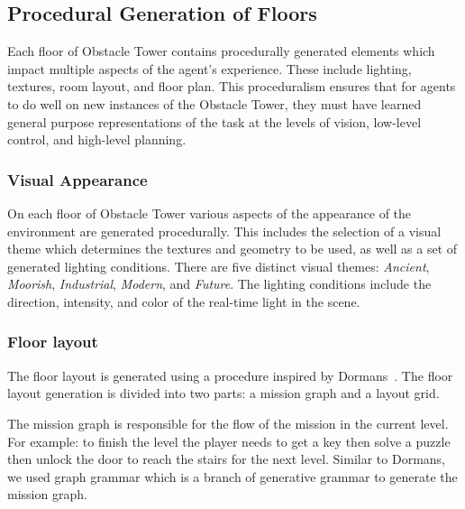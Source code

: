 \documentclass{article}
\begin{document}
\subsection{Procedural Generation of Floors}
Each floor of Obstacle Tower contains procedurally generated elements which impact multiple aspects of the agent's experience. These include lighting, textures, room layout, and floor plan. This proceduralism  ensures that for agents to do well on new instances of the Obstacle Tower, they must have learned general purpose representations of the task at the levels of vision, low-level control, and high-level planning. 

\subsubsection{Visual Appearance} On each floor of Obstacle Tower various aspects of the appearance of the environment are generated procedurally. This includes the selection of a visual theme which determines the textures and geometry to be used, as well as a set of generated lighting conditions. There are five distinct visual themes:  \emph{Ancient}, \emph{Moorish}, \emph{Industrial}, \emph{Modern}, and \emph{Future}. The lighting conditions include the direction, intensity, and color of the real-time light in the scene. 

\subsubsection{Floor layout} The floor layout is generated using a procedure inspired by Dormans~\cite{dormans2010adventures}. The floor layout generation is divided into two parts: a mission graph and a layout grid. 

The mission graph is responsible for the flow of the mission in the current level. For example: to finish the level the player needs to get a key then solve a puzzle then unlock the door to reach the stairs for the next level. Similar to Dormans, we used graph grammar which is a branch of generative grammar to generate the mission graph. 
\end{document}
